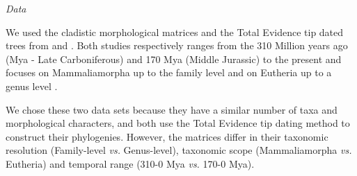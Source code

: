 \documentclass[12pt,letterpaper]{article}
\renewcommand{\subsection}[1]{%
\bigskip
\begin{center}
\begin{large}
\normalfont\itshape #1
\end{large}
\end{center}}
\begin{document}

\subsection{Data} %
We used the cladistic morphological matrices and the Total Evidence tip dated trees \citep{ronquista2012} from \cite[][103 taxa and 446 morphological characters]{MEE3:MEE312084} and \cite[][102 taxa and 421 morphological characters]{beckancient2014}. Both studies respectively ranges from the 310 Million years ago (Mya - Late Carboniferous) and 170 Mya (Middle Jurassic) to the present and focuses on Mammaliamorpha up to the family level \cite{MEE3:MEE312084} and on Eutheria up to a genus level \cite{beckancient2014}. 

We chose these two data sets because they have a similar number of taxa and morphological characters, and both use the Total Evidence tip dating method \citep{ronquista2012} to construct their phylogenies. However, the matrices differ in their taxonomic resolution (Family-level \textit{vs.} Genus-level), taxonomic scope (Mammaliamorpha \textit{vs.} Eutheria) and temporal range (310-0 Mya \textit{vs.} 170-0 Mya). %
\end{document}
